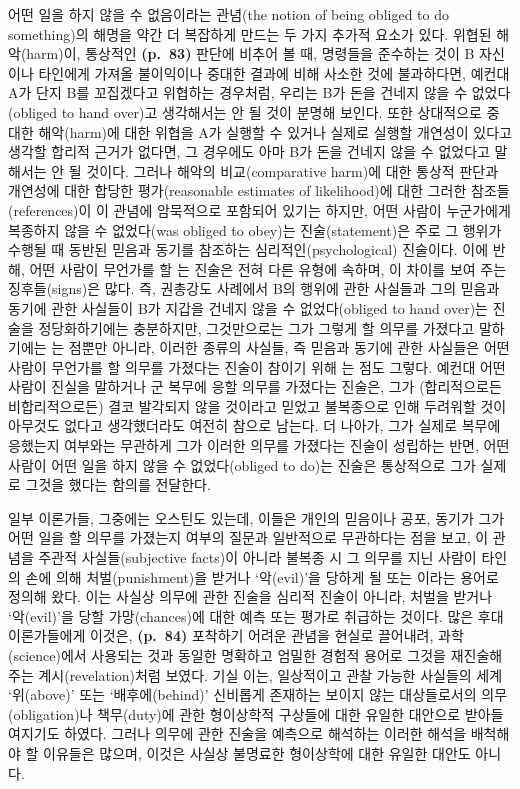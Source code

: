 어떤 일을 하지 않을 수 없음이라는 관념(the notion of being obliged to do
something)의 해명을 약간 더 복잡하게 만드는 두 가지 추가적 요소가 있다.
위협된 해악(harm)이, 통상적인 \textbf{(p.~83)} 판단에 비추어 볼 때,
명령들을 준수하는 것이 B 자신이나 타인에게 가져올 불이익이나 중대한
결과에 비해 사소한 것에 불과하다면, 예컨대 A가 단지 B를 꼬집겠다고
위협하는 경우처럼, 우리는 B가 돈을 건네지 않을 수 없었다(obliged to hand
over)고 생각해서는 안 될 것이 분명해 보인다. 또한 상대적으로 중대한
해악(harm)에 대한 위협을 A가 실행할 수 있거나 실제로 실행할 개연성이
있다고 생각할 합리적 근거가 없다면, 그 경우에도 아마 B가 돈을 건네지
않을 수 없었다고 말해서는 안 될 것이다. 그러나 해악의 비교(comparative
harm)에 대한 통상적 판단과 개연성에 대한 합당한 평가(reasonable
estimates of likelihood)에 대한 그러한 참조들(references)이 이 관념에
암묵적으로 포함되어 있기는 하지만, 어떤 사람이 누군가에게 복종하지 않을
수 없었다(was obliged to obey)는 진술(statement)은 주로 그 행위가 수행될
때 동반된 믿음과 동기를 참조하는 심리적인(psychological) 진술이다. 이에
반해, 어떤 사람이 무언가를 할 는
진술은 전혀 다른 유형에 속하며, 이 차이를 보여 주는 징후들(signs)은
많다. 즉, 권총강도 사례에서 B의 행위에 관한 사실들과 그의 믿음과 동기에
관한 사실들이 B가 지갑을 건네지 않을 수 없었다(obliged to hand over)는
진술을 정당화하기에는 충분하지만, 그것만으로는 그가 그렇게 할 의무를
가졌다고 말하기에는 는 점뿐만
아니라, 이러한 종류의 사실들, 즉 믿음과 동기에 관한 사실들은 어떤 사람이
무언가를 할 의무를 가졌다는 진술이 참이기 위해 는 점도 그렇다. 예컨대 어떤 사람이 진실을 말하거나 군 복무에
응할 의무를 가졌다는 진술은, 그가 (합리적으로든 비합리적으로든) 결코
발각되지 않을 것이라고 믿었고 불복종으로 인해 두려워할 것이 아무것도
없다고 생각했더라도 여전히 참으로 남는다. 더 나아가, 그가 실제로 복무에
응했는지 여부와는 무관하게 그가 이러한 의무를 가졌다는 진술이 성립하는
반면, 어떤 사람이 어떤 일을 하지 않을 수 없었다(obliged to do)는 진술은
통상적으로 그가 실제로 그것을 했다는 함의를 전달한다.

일부 이론가들, 그중에는 오스틴도 있는데, 이들은 개인의 믿음이나 공포,
동기가 그가 어떤 일을 할 의무를 가졌는지 여부의 질문과 일반적으로
무관하다는 점을 보고, 이 관념을 주관적 사실들(subjective facts)이 아니라
불복종 시 그 의무를 지닌 사람이 타인의 손에 의해 처벌(punishment)을
받거나 ‘악(evil)’을 당하게 될  또는
이라는 용어로 정의해 왔다. 이는 사실상 의무에
관한 진술을 심리적 진술이 아니라, 처벌을 받거나 ‘악(evil)’을 당할
가망(chances)에 대한 예측 또는 평가로 취급하는 것이다. 많은 후대
이론가들에게 이것은, \textbf{(p.~84)} 포착하기 어려운 관념을 현실로
끌어내려, 과학(science)에서 사용되는 것과 동일한 명확하고 엄밀한 경험적
용어로 그것을 재진술해 주는 계시(revelation)처럼 보였다. 기실 이는,
일상적이고 관찰 가능한 사실들의 세계 ‘위(above)’ 또는 ‘배후에(behind)’
신비롭게 존재하는 보이지 않는 대상들로서의 의무(obligation)나
책무(duty)에 관한 형이상학적 구상들에 대한 유일한 대안으로
받아들여지기도 하였다. 그러나 의무에 관한 진술을 예측으로 해석하는
이러한 해석을 배척해야 할 이유들은 많으며, 이것은 사실상 불명료한
형이상학에 대한 유일한 대안도 아니다.

